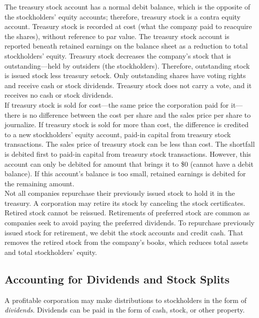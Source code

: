 \documentclass{article}
\begin{document}
The treasury stock account has a normal debit balance, which is the opposite of the stockholders' equity accounts; therefore, treasury stock is a contra equity account. Treasury stock is recorded at cost (what the company paid to reacquire the shares), without reference to par value. The treasury stock account is reported beneath retained earnings on the balance sheet as a reduction to total stockholders' equity. Treasury stock decreases the company's stock that is outstanding---held by outsiders (the stockholders). Therefore, outstanding stock is issued stock less treasury setock. Only outstanding shares have voting rights and receive cash or stock dividends. Treasury stock does not carry a vote, and it receives no cash or stock dividends. \\ 

If treasury stock is sold for cost---the same price the corporation paid for it---there is no difference between the cost per share and the sales price per share to journalize. If treasury stock is sold for more than cost, the difference is credited to a new stockholders' equity account, paid-in capital from treasury stock transactions. The sales price of treasury stock can be less than cost. The shortfall is debited first to paid-in capital from treasury stock transactions. However, this account can only be debited for amount that brings it to \$0 (cannot have a debit balance). If this account's balance is too small, retained earnings is debited for the remaining amount. \\ 

Not all companies repurchase their previously issued stock to hold it in the treasury. A corporation may retire its stock by canceling the stock certificates. Retired stock cannot be reissued. Retirements of preferred stock are common as companies seek to avoid paying the preferred dividends. To repurchase previously issued stock for retirement, we debit the stock accounts and credit cash. That removes the retired stock from the company's books, which reduces total assets and total stockholders' equity. 

\subsection{Accounting for Dividends and Stock Splits}

A profitable corporation may make distributions to stockholders in the form of \emph{dividends}. Dividends can be paid in the form of cash, stock, or other property. \\ 
\end{document}
